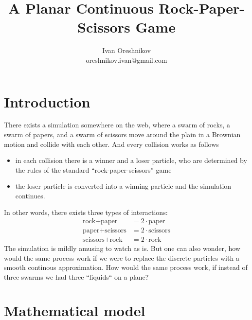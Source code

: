 \documentclass[a4paper, 11pt]{article}
\title{A Planar Continuous Rock-Paper-Scissors Game}
\author{Ivan Oreshnikov \\ oreshnikov.ivan@gmail.com}
\begin{document}
\maketitle

\section{Introduction}

There exists a simulation somewhere on the web, where a swarm of rocks, a swarm of papers, and a swarm of scissors move around the plain in a Brownian motion and collide with each other. And every collision works as follows
\begin{itemize}
    \item{in each collision there is a winner and a loser particle, who are determined by the rules of the standard ``rock-paper-scissors'' game}
    \item{the loser particle is converted into a winning particle and the simulation continues.}
\end{itemize}
In other words, there exists three types of interactions:
\begin{align*}
    \text{rock} + \text{paper} &= 2 \cdot \text{paper} \\
    \text{paper} + \text{scissors} &= 2 \cdot \text{scissors} \\
    \text{scissors} + \text{rock} &= 2 \cdot \text{rock}
\end{align*}
The simulation is mildly amusing to watch as is. But one can also wonder, how would the same process work if we were to replace the discrete particles with a smooth continous approximation. How would the same process work, if instead of three swarms we had three ``liquids`` on a plane?

\section{Mathematical model}
\end{document}
